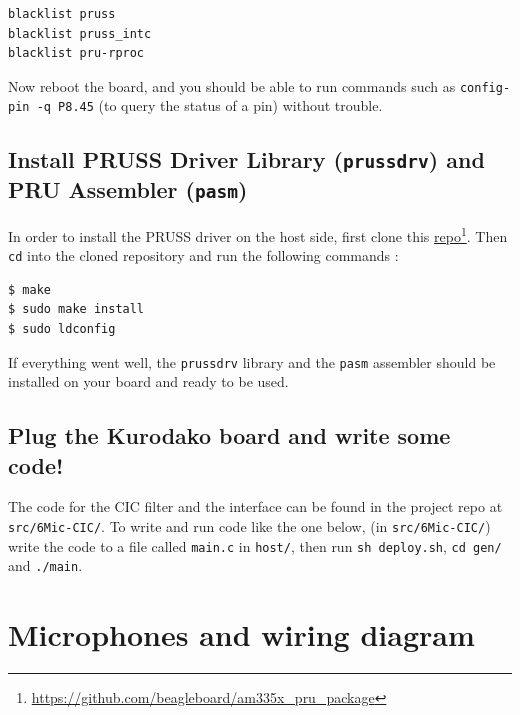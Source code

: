 \documentclass[]{report}
\begin{document}
\begin{verbatim}
blacklist pruss
blacklist pruss_intc
blacklist pru-rproc
\end{verbatim}

\noindent Now reboot the board, and you should be able to run commands such as
\texttt{config-pin\ -q\ P8.45} (to query the status of a pin) without trouble.

\hypertarget{install-pruss-driver-library-prussdrv-and-pru-assembler-pasm}{%
\subsection{\texorpdfstring{Install PRUSS Driver Library
(\texttt{prussdrv}) and PRU Assembler
(\texttt{pasm})}{Install PRUSS Driver Library (prussdrv) and PRU Assembler (pasm)}}\label{install-pruss-driver-library-prussdrv-and-pru-assembler-pasm}}

In order to install the PRUSS driver on the host side, first clone this
\href{https://github.com/beagleboard/am335x_pru_package}{repo}\footnote{\url{https://github.com/beagleboard/am335x_pru_package}}. Then
\texttt{cd} into the cloned repository and run the following commands :

\begin{verbatim}
$ make
$ sudo make install
$ sudo ldconfig
\end{verbatim}

If everything went well, the \texttt{prussdrv} library and the
\texttt{pasm} assembler should be installed on your board and ready to
be used.

\hypertarget{plug-the-octopus-board-and-write-some-code}{%
\subsection{Plug the Kurodako board and write some
code!}\label{plug-the-octopus-board-and-write-some-code}}

The code for the CIC filter and the interface can be found in the project repo at
\texttt{src/6Mic-CIC/}. To write and run code like the one below, (in \texttt{src/6Mic-CIC/})
write the code to a file called \texttt{main.c} in \texttt{host/}, then run
\texttt{sh\ deploy.sh}, \texttt{cd\ gen/} and \texttt{./main}.



\hypertarget{microphones-and-wiring-diagram}{%
\section{Microphones and wiring
diagram}\label{microphones-and-wiring-diagram}}
\end{document}
